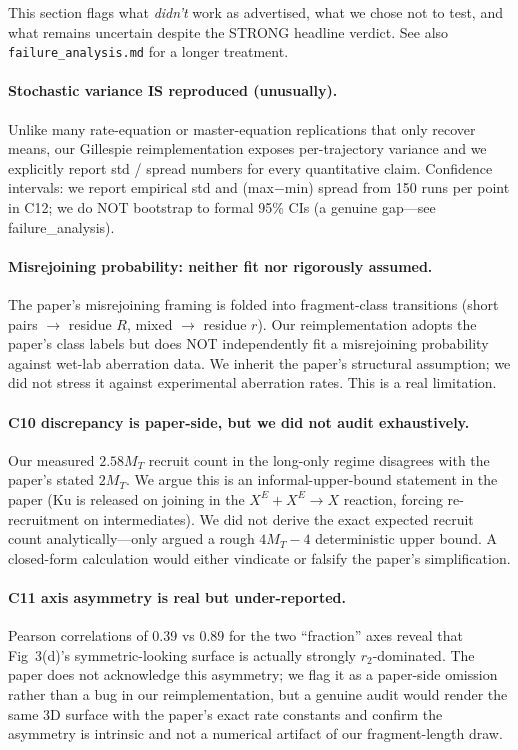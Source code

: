 \documentclass[11pt]{article}
\begin{document}
This section flags what \emph{didn't} work as advertised, what we chose not to test, and
what remains uncertain despite the STRONG headline verdict. See also
\texttt{failure\_analysis.md} for a longer treatment.

\paragraph{Stochastic variance IS reproduced (unusually).}
Unlike many rate-equation or master-equation replications that only recover means, our
Gillespie reimplementation exposes per-trajectory variance and we explicitly report
std / spread numbers for every quantitative claim. Confidence intervals: we report empirical
std and (max$-$min) spread from 150 runs per point in C12; we do NOT bootstrap to
formal 95\% CIs (a genuine gap---see failure\_analysis).

\paragraph{Misrejoining probability: neither fit nor rigorously assumed.}
The paper's misrejoining framing is folded into fragment-class transitions (short pairs
$\to$ residue $R$, mixed $\to$ residue $r$). Our reimplementation adopts the paper's
class labels but does NOT independently fit a misrejoining probability against wet-lab
aberration data. We inherit the paper's structural assumption; we did not stress it
against experimental aberration rates. This is a real limitation.

\paragraph{C10 discrepancy is paper-side, but we did not audit exhaustively.}
Our measured $2.58 M_T$ recruit count in the long-only regime disagrees with the paper's
stated $2 M_T$. We argue this is an informal-upper-bound statement in the paper (Ku is
released on joining in the $X^E{+}X^E \to X$ reaction, forcing re-recruitment on
intermediates). We did not derive the exact expected recruit count analytically---only
argued a rough $4M_T{-}4$ deterministic upper bound. A closed-form calculation would
either vindicate or falsify the paper's simplification.

\paragraph{C11 axis asymmetry is real but under-reported.}
Pearson correlations of 0.39 vs 0.89 for the two ``fraction'' axes reveal that Fig~3(d)'s
symmetric-looking surface is actually strongly $r_2$-dominated. The paper does not
acknowledge this asymmetry; we flag it as a paper-side omission rather than a bug in
our reimplementation, but a genuine audit would render the same 3D surface with the
paper's exact rate constants and confirm the asymmetry is intrinsic and not a numerical
artifact of our fragment-length draw.
\end{document}
